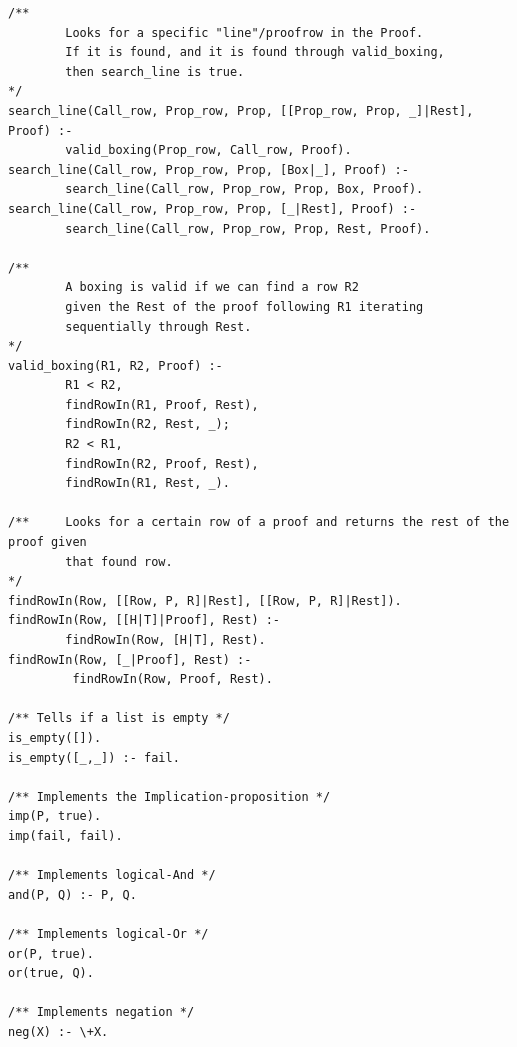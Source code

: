 \documentclass[a4paper]{article}
\begin{document}
\begin{verbatim}
/**
        Looks for a specific "line"/proofrow in the Proof.
        If it is found, and it is found through valid_boxing,
        then search_line is true.
*/
search_line(Call_row, Prop_row, Prop, [[Prop_row, Prop, _]|Rest], Proof) :- 
		valid_boxing(Prop_row, Call_row, Proof).
search_line(Call_row, Prop_row, Prop, [Box|_], Proof) :-
        search_line(Call_row, Prop_row, Prop, Box, Proof).
search_line(Call_row, Prop_row, Prop, [_|Rest], Proof) :-
        search_line(Call_row, Prop_row, Prop, Rest, Proof).

/**
        A boxing is valid if we can find a row R2
        given the Rest of the proof following R1 iterating
        sequentially through Rest.
*/
valid_boxing(R1, R2, Proof) :-
        R1 < R2,
        findRowIn(R1, Proof, Rest),
        findRowIn(R2, Rest, _);
        R2 < R1,
        findRowIn(R2, Proof, Rest),
        findRowIn(R1, Rest, _).

/**     Looks for a certain row of a proof and returns the rest of the proof given
        that found row.
*/
findRowIn(Row, [[Row, P, R]|Rest], [[Row, P, R]|Rest]).
findRowIn(Row, [[H|T]|Proof], Rest) :-
        findRowIn(Row, [H|T], Rest).
findRowIn(Row, [_|Proof], Rest) :-
         findRowIn(Row, Proof, Rest).

/** Tells if a list is empty */
is_empty([]).
is_empty([_,_]) :- fail.

/** Implements the Implication-proposition */
imp(P, true).
imp(fail, fail).

/** Implements logical-And */
and(P, Q) :- P, Q.

/** Implements logical-Or */
or(P, true).
or(true, Q).

/** Implements negation */
neg(X) :- \+X.
\end{verbatim}
\end{document}
